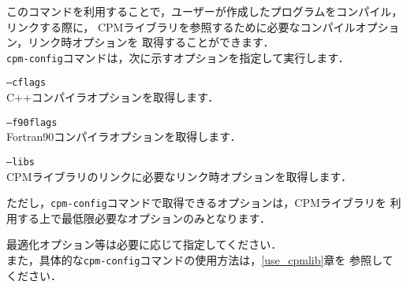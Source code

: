 このコマンドを利用することで，ユーザーが作成したプログラムをコンパイル，リンクする際に，
CPMライブラリを参照するために必要なコンパイルオプション，リンク時オプションを
取得することができます．\\

{\tt cpm-config}コマンドは，次に示すオプションを指定して実行します．

\begin{description}
\item{\tt --cflags} \\
  C++コンパイラオプションを取得します．\\
\item{\tt --f90flags} \\
  Fortran90コンパイラオプションを取得します．\\
\item{\tt --libs} \\
  CPMライブラリのリンクに必要なリンク時オプションを取得します．\\
\end{description}

ただし，{\tt cpm-config}コマンドで取得できるオプションは，CPMライブラリを
利用する上で最低限必要なオプションのみとなります．

最適化オプション等は必要に応じて指定してください．\\

また，具体的な{\tt cpm-config}コマンドの使用方法は，\ref{use_cpmlib}章を
参照してください．
\clearpage
